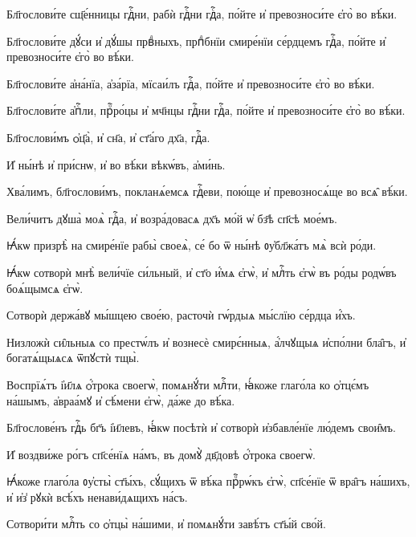 \hKv Бл҃гослови́те сщ҃е́нницы гдⷭ҇ни, рабѝ гдⷭ҇ни гдⷭ҇а,  по́йте и҆ превозноси́те є҆го̀ во вѣ́ки. 

\hKv Бл҃гослови́те дꙋ́си и҆ дꙋ́шы првⷣныхъ, прпⷣбнїи смире́нїи  се́рдцемъ гдⷭ҇а, по́йте и҆ превозноси́те є҆го̀ во вѣ́ки. 
%

\hKv Бл҃гослови́те а҆на́нїа, а҆за́рїа, мїсаи́лъ гдⷭ҇а,  по́йте и҆ превозноси́те є҆го̀ во вѣ́ки. 

\hKv Бл҃гослови́те а҆пⷭ҇ли, прⷪ҇ро́цы и҆ мч҃нцы гдⷭ҇ни гдⷭ҇а,  по́йте и҆ превозноси́те є҆го̀ во вѣ́ки. 

\hKv Бл҃гослови́мъ ѻ҆ц҃а̀, и҆ сн҃а, и҆ ст҃а́го дх҃а, гдⷭ҇а. 

\hKv И҆ ны́нѣ и҆ при́снѡ, и҆ во вѣ́ки вѣкѡ́въ, а҆ми́нь. 

 Хва́лимъ, бл҃гослови́мъ, покланѧ́емсѧ  гдⷭ҇еви, пою́ще и҆ превозносѧ́ще во всѧ̑ вѣ́ки. 


\hKv Вели́читъ дꙋша̀ моѧ̀ гдⷭ҇а, и҆ возра́довасѧ дх҃ъ мо́й ѡ҆  бз҃ѣ сп҃сѣ мое́мъ. 

\hKv Ꙗ҆́кѡ призрѣ̀ на смире́нїе рабы̀ своеѧ̀, се́ бо ѿ ны́нѣ  ᲂу҆бл҃жа́тъ мѧ̀ всѝ ро́ди.  

\hKv Ꙗ҆́кѡ сотворѝ мнѣ̀ вели́чїе си́льный, и҆ ст҃о и҆́мѧ  є҆гѡ̀, и҆ млⷭ҇ть є҆гѡ̀ въ ро́ды родѡ́въ боѧ́щымсѧ є҆гѡ̀. 

\hKv Сотворѝ держа́вꙋ мы́шцею свое́ю, расточѝ гѡ́рдыѧ мы́слїю  се́рдца и҆́хъ. 

\hKv Низложѝ си̑льныѧ со престѡ́лъ и҆ вознесѐ смирє́нныѧ,  а҆́лчꙋщыѧ и҆спо́лни бла̑гъ, и҆ богатѧ́щыѧсѧ ѿпꙋстѝ тщы̀. 

\hKv Воспрїѧ́тъ і҆и҃лѧ ѻ҆́трока своегѡ̀, помѧнꙋ́ти млⷭ҇ти,  ꙗ҆́коже глаго́ла ко ѻ҆тцє́мъ на́шымъ, а҆враа́мꙋ и҆  сѣ́мени є҆гѡ̀, да́же до вѣ́ка. 


\hKv Бл҃гослове́нъ гдⷭ҇ь бг҃ъ і҆и҃левъ, ꙗ҆́кѡ посѣтѝ и҆  сотворѝ и҆збавле́нїе лю́демъ свои̑мъ. 

\hKv И҆ воздви́же ро́гъ сп҃се́нїѧ на́мъ, въ домꙋ̀ дв҃довѣ  ѻ҆́трока своегѡ̀. 

\hKv Ꙗ҆́коже глаго́ла ᲂу҆сты̀ ст҃ы́хъ, сꙋ́щихъ ѿ вѣ́ка  прⷪ҇рѡ́къ є҆гѡ̀, сп҃се́нїе ѿ вра̑гъ на́шихъ, и҆ и҆з̾  рꙋкѝ всѣ́хъ ненави́дѧщихъ на́съ.  

\hKv Сотвори́ти млⷭ҇ть со ѻ҆тцы̀ на́шими, и҆ помѧнꙋ́ти завѣ́тъ  ст҃ы́й сво́й. 
%

